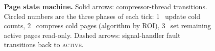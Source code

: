 \begin{figure}[t]
\caption{\textbf{Page state machine.}
  Solid arrows: compressor-thread transitions.
  Circled numbers are the three phases of each tick:
  \textcircled{\small 1}~update cold counts,
  \textcircled{\small 2}~compress cold pages (algorithm by ROI),
  \textcircled{\small 3}~set remaining active pages read-only.
  Dashed arrows: signal-handler fault transitions back to
  \textsc{active}.}
\label{fig:arch}
\end{figure}
